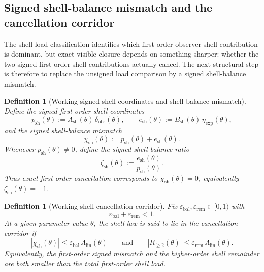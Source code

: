 \documentclass[12pt,a4paper]{article}
\newtheorem{definition}[theorem]{Definition}
\begin{document}
\subsection*{Signed shell-balance mismatch and the cancellation corridor}
The shell-load classification identifies which first-order observer-shell contribution is dominant, but exact visible closure depends on something sharper: whether the two signed first-order shell contributions actually cancel. The next structural step is therefore to replace the unsigned load comparison by a signed shell-balance mismatch.

\begin{definition}[Working signed shell coordinates and shell-balance mismatch]
Define the signed first-order shell coordinates
\[
 p_{\mathrm{sh}}(\theta):=A_{\mathrm{sh}}(\theta)\,\delta_{\mathrm{obs}}(\theta),
 \qquad
 e_{\mathrm{sh}}(\theta):=B_{\mathrm{sh}}(\theta)\,\eta_{\mathrm{exp}}(\theta),
\]
and the signed shell-balance mismatch
\[
 \chi_{\mathrm{sh}}(\theta):=p_{\mathrm{sh}}(\theta)+e_{\mathrm{sh}}(\theta).
\]
Whenever $p_{\mathrm{sh}}(\theta)\neq 0$, define the signed shell-balance ratio
\[
 \zeta_{\mathrm{sh}}(\theta):=\frac{e_{\mathrm{sh}}(\theta)}{p_{\mathrm{sh}}(\theta)}.
\]
Thus exact first-order cancellation corresponds to $\chi_{\mathrm{sh}}(\theta)=0$, equivalently $\zeta_{\mathrm{sh}}(\theta)=-1$.
\end{definition}

\begin{definition}[Working shell-cancellation corridor]
Fix $\varepsilon_{\mathrm{bal}},\varepsilon_{\mathrm{rem}}\in[0,1)$ with
\[
 \varepsilon_{\mathrm{bal}}+\varepsilon_{\mathrm{rem}}<1.
\]
At a given parameter value $\theta$, the shell law is said to lie in the \emph{cancellation corridor} if
\[
 |\chi_{\mathrm{sh}}(\theta)|\le \varepsilon_{\mathrm{bal}}\,\Lambda_{\mathrm{lin}}(\theta)
 \qquad\text{and}\qquad
 |R_{\ge 2}(\theta)|\le \varepsilon_{\mathrm{rem}}\,\Lambda_{\mathrm{lin}}(\theta).
\]
Equivalently, the first-order signed mismatch and the higher-order shell remainder are both smaller than the total first-order shell load.
\end{definition}
\end{document}
